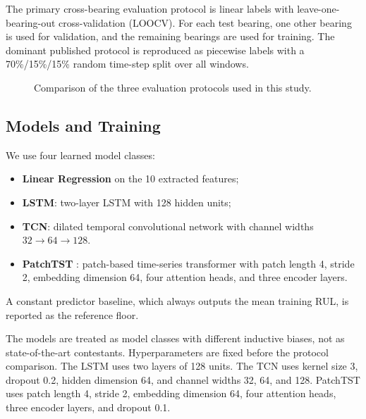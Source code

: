 \documentclass[pdflatex,sn-mathphys-num]{sn-jnl}
\begin{document}
The primary cross-bearing evaluation protocol is linear labels with leave-one-bearing-out cross-validation (LOOCV). For each test bearing, one other bearing is used for validation, and the remaining bearings are used for training. The dominant published protocol is reproduced as piecewise labels with a 70\%/15\%/15\% random time-step split over all windows.

\begin{figure}[t]
\centering
{}
\caption{Comparison of the three evaluation protocols used in this study.}
\label{fig:protocols}
\end{figure}

\subsection{Models and Training}
We use four learned model classes:
\begin{itemize}
    \item \textbf{Linear Regression} on the 10 extracted features;
    \item \textbf{LSTM}: two-layer LSTM with 128 hidden units;
    \item \textbf{TCN}: dilated temporal convolutional network with channel widths $32 \to 64 \to 128$.
    \item \textbf{PatchTST} \cite{patchtst2023}: patch-based time-series transformer with patch length 4, stride 2, embedding dimension 64, four attention heads, and three encoder layers.
\end{itemize}
A constant predictor baseline, which always outputs the mean training RUL, is reported as the reference floor.

The models are treated as model classes with different inductive biases, not as state-of-the-art contestants. Hyperparameters are fixed before the protocol comparison. The LSTM uses two layers of 128 units. The TCN uses kernel size 3, dropout 0.2, hidden dimension 64, and channel widths 32, 64, and 128. PatchTST uses patch length 4, stride 2, embedding dimension 64, four attention heads, three encoder layers, and dropout 0.1.
\end{document}
